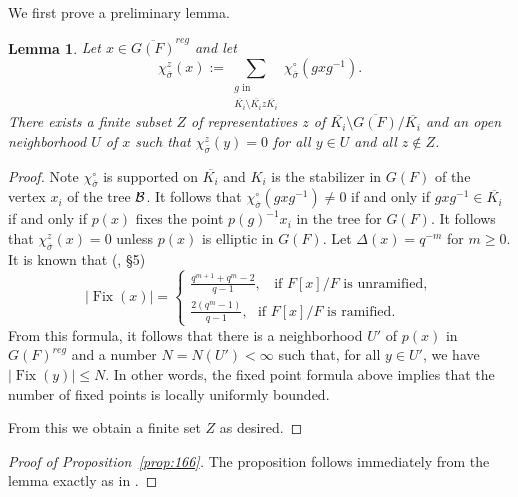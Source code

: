 \documentclass[12pt,letterpaper,openany]{book}
\theoremstyle{plain}
\newtheorem{lemma}[theorem]{Lemma}
\theoremstyle{definition}
\theoremstyle{remark}
\theoremstyle{remark}
\begin{document}
We first prove a preliminary lemma.
\begin{lemma} Let $x\in \overline{G(F)}^{reg}$ and let
$$
\chi_{\overline{\sigma}}^z(x):=\sum_{\substack{ g \text{ in }\\
\overline{K_i}\setminus\overline{K_i}z\overline{K_i}}}
\chi_{\overline{\sigma}}^\circ (gxg^{-1}).
$$
There exists a finite subset $Z$ of representatives $z$ of
$\overline{K_i}\setminus\overline{G(F)}/\overline{K_i}$
and an open neighborhood $U$ of $x$ such that
$\chi_{\overline{\sigma}}^z(y)=0$ for all $y\in U$ and all $z\notin Z$.
\end{lemma}
\begin{proof} Note $\chi_{\overline{\sigma}}^\circ$ is supported
on $\overline{K_i}$ and $K_i$ is the stabilizer in $G(F)$ of the vertex
$x_i$ of the tree ${\cal{B}}$.
It follows that $\chi_{\overline{\sigma}}^\circ (gxg^{-1})\not= 0$
if and only if $gxg^{-1}\in \overline{K_i}$ if and only if
$p(x)$ fixes the point $p(g)^{-1}x_i$ in the tree for $G(F)$.
It follows that
$\chi_{\overline{\sigma}}^z (x)= 0$ unless $p(x)$ is elliptic
in $G(F)$. Let $\Delta (x)=q^{-m}$ for $m\geq 0$. It is known that
(\cite{L4}, \S 5)
\begin{equation}
|\operatorname{Fix}(x)|=
\left\{ \begin{array}{c}
\frac{q^{m+1}+q^m-2}{q-1},\ \ \ \ \text{if $F[x]/F$ is unramified},\\
\frac{2(q^m-1)}{q-1},\ \ \ \text{if $F[x]/F$ is ramified}.
\end{array} \right.
\end{equation}
From this formula, it follows that there is a neighborhood $U'$
of $p(x)$ in $G(F)^{reg}$ and a number $N=N(U')<\infty$
such that, for all $y\in U'$, we have $|\operatorname{Fix}(y)|\leq N$.
In other words, the fixed point formula above implies that the
number of fixed points is locally uniformly bounded.

From this we obtain a finite set $Z$ as desired.
\end{proof}

\begin{proof}[Proof of Proposition~\ref{prop:166}]
The proposition follows immediately from
the lemma exactly as in \cite[p.~213]{Kut}.
\end{proof}
\end{document}
